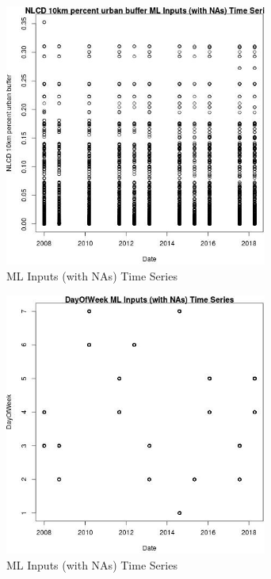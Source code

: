 \begin{figure} 
\centering  
\includegraphics[width=0.77\textwidth]{Code_Outputs/Report_ML_input_PM25_Step4_part_e_de_duplicated_aves_compiled_2019-05-18wNAs_NLCD_10km_percent_urban_buffervDate.jpg} 
\caption{\label{fig:Report_ML_input_PM25_Step4_part_e_de_duplicated_aves_compiled_2019-05-18wNAsNLCD_10km_percent_urban_buffervDate}ML Inputs (with NAs) Time Series} 
\end{figure} 
 

\clearpage 

\begin{figure} 
\centering  
\includegraphics[width=0.77\textwidth]{Code_Outputs/Report_ML_input_PM25_Step4_part_e_de_duplicated_aves_compiled_2019-05-18wNAs_DayOfWeekvDate.jpg} 
\caption{\label{fig:Report_ML_input_PM25_Step4_part_e_de_duplicated_aves_compiled_2019-05-18wNAsDayOfWeekvDate}ML Inputs (with NAs) Time Series} 
\end{figure} 
 
